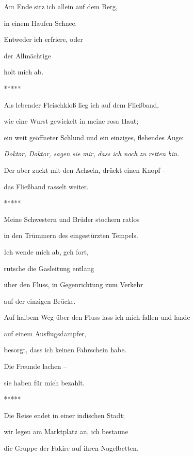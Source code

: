 

\bigskip

Am Ende sitz ich allein auf dem Berg,

in einem Haufen Schnee.

Entweder ich erfriere, oder

der Allmächtige

holt mich ab.


\bigskip

*****


\bigskip

Als lebender Fleischkloß lieg ich auf dem Fließband,

wie eine Wurst gewickelt in meine rosa Haut;

ein weit geöffneter Schlund und ein einziges, flehendes Auge:

\emph{
Doktor, Doktor, sagen sie mir, dass ich noch zu retten bin.}

Der aber zuckt mit den Achseln, drückt einen Knopf --

das Fließband rasselt weiter.


\bigskip

*****


\bigskip

Meine Schwestern und Brüder stochern ratlos 

in den Trümmern des eingestürzten Tempels.

Ich wende mich ab, geh fort, 

rutsche die Gasleitung entlang

über den Fluss, in Gegenrichtung zum Verkehr

auf der einzigen Brücke.


\bigskip

Auf halbem Weg über den Fluss lass ich mich fallen und lande

auf einem Ausflugsdampfer,

besorgt, dass ich keinen Fahrschein habe.

Die Freunde lachen -- 

sie haben für mich bezahlt.


\bigskip

*****


\bigskip


\bigskip

Die Reise endet in einer indischen Stadt;

wir legen am Marktplatz an, ich bestaune

die Gruppe der Fakire auf ihren Nagelbetten.

